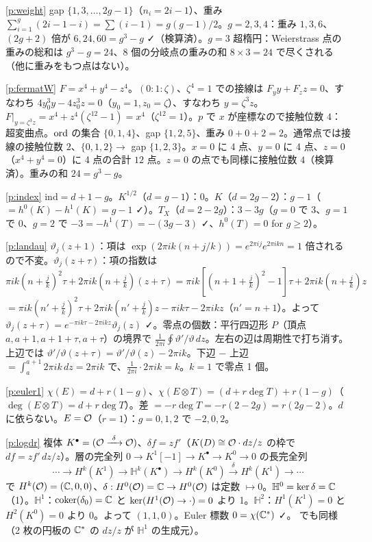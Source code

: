 \begin{sol}{\ref{p:weight}}
gap $\{1,3,\dots,2g-1\}$（$n_i=2i-1$）、重み $\sum_{i=1}^g(2i-1-i)=\sum(i-1)=g(g-1)/2$。$g=2,3,4$：重み $1,3,6$、$(2g+2)$ 倍が $6,24,60=g^3-g$ ✓（検算済）。$g=3$ 超楕円：Weierstrass 点の重みの総和は $g^3-g=24$、$8$ 個の分岐点の重みの和 $8\times3=24$ で尽くされる（他に重みをもつ点はない）。
\end{sol}
\begin{sol}{\ref{p:fermatW}}
$F=x^4+y^4-z^4$。$(0:1:\zeta)$、$\zeta^4=1$ での接線は $F_yy+F_zz=0$、すなわち $4y_0^3y-4z_0^3z=0$（$y_0=1,z_0=\zeta$）、すなわち $y=\zeta^3z$。$F|_{y=\zeta^3z}=x^4+z^4(\zeta^{12}-1)=x^4$（$\zeta^{12}=1$）。$p$ で $x$ が座標なので接触位数 $4$：超変曲点。$\operatorname{ord}$ の集合 $\{0,1,4\}$、gap $\{1,2,5\}$、重み $0+0+2=2$。通常点では接線の接触位数 $2$、$\{0,1,2\}\to$ gap $\{1,2,3\}$。$x=0$ に 4 点、$y=0$ に 4 点、$z=0$（$x^4+y^4=0$）に 4 点の合計 $12$ 点。$z=0$ の点でも同様に接触位数 $4$（検算済）。重みの和 $24=g^3-g$。
\end{sol}
\begin{sol}{\ref{p:index}}
$\mathrm{ind}=d+1-g$。$K^{1/2}$（$d=g-1$）：$0$。$K$（$d=2g-2$）：$g-1$（$=h^0(K)-h^1(K)=g-1$ ✓）。$T_X$（$d=2-2g$）：$3-3g$（$g=0$ で $3$、$g=1$ で $0$、$g=2$ で $-3=-h^1(T)=-(3g-3)$ ✓、$h^0(T)=0$ for $g\ge2$）。
\end{sol}
\begin{sol}{\ref{p:landau}}
$\vartheta_j(z+1)$：項は $\exp(2\pi ik(n+j/k))=e^{2\pi ij}e^{2\pi ikn}=1$ 倍されるので不変。$\vartheta_j(z+\tau)$：項の指数は $\pi ik(n+\tfrac jk)^2\tau+2\pi ik(n+\tfrac jk)(z+\tau)=\pi ik[(n+1+\tfrac jk)^2-1]\tau+2\pi ik(n+\tfrac jk)z$ $=\pi ik(n'+\tfrac jk)^2\tau+2\pi ik(n'+\tfrac jk)z-\pi ik\tau-2\pi ikz$（$n'=n+1$）。よって $\vartheta_j(z+\tau)=e^{-\pi ik\tau-2\pi ikz}\vartheta_j(z)$ ✓。零点の個数：平行四辺形 $P$（頂点 $a,a+1,a+1+\tau,a+\tau$）の境界で $\frac1{2\pi i}\oint\vartheta'/\vartheta\,dz$。左右の辺は周期性で打ち消す。上辺では $\vartheta'/\vartheta(z+\tau)=\vartheta'/\vartheta(z)-2\pi ik$。下辺 $-$ 上辺 $=\int_a^{a+1}2\pi ik\,dz=2\pi ik$ で、$\frac1{2\pi i}\cdot2\pi ik=k$。$k=1$ で零点 1 個。
\end{sol}
\begin{sol}{\ref{p:euler1}}
$\chi(E)=d+r(1-g)$、$\chi(E\otimes T)=(d+r\deg T)+r(1-g)$（$\deg(E\otimes T)=d+r\deg T$）。差 $=-r\deg T=-r(2-2g)=r(2g-2)$。$d$ に依らない。$E=\mathcal O$（$r=1$）：$g=0,1,2$ で $-2,0,2$。
\end{sol}
\begin{sol}{\ref{p:logdr}}
複体 $K^\bullet=(\Oc\xrightarrow{\ \delta\ }\Oc)$、$\delta f=zf'$（$K(D)\cong\mathcal O\cdot dz/z$ の枠で $df=zf'\,dz/z$）。層の完全列 $0\to K^1[-1]\to K^\bullet\to K^0\to0$ の長完全列
\[
\cdots\to H^k(K^1)\to\mathbb H^k(K^\bullet)\to H^k(K^0)\xrightarrow{\delta}H^k(K^1)\to\cdots
\]
で $H^k(\mathcal O)=(\mathbb C,0,0)$、$\delta:H^0(\mathcal O)=\mathbb C\to H^0(\mathcal O)$ は定数 $\mapsto0$。$\mathbb H^0=\ker\delta=\mathbb C$（1）。$\mathbb H^1$：$\mathrm{coker}(\delta_0)=\mathbb C$ と $\ker(H^1(\mathcal O)\to\cdot)=0$ より 1。$\mathbb H^2$：$H^1(K^1)=0$ と $H^2(K^0)=0$ より $0$。よって $(1,1,0)$。Euler 標数 $0=\chi(\mathbb C^*)$ ✓。\Cech{} でも同様（2 枚の円板の $\mathbb C^*$ の $dz/z$ が $\mathbb H^1$ の生成元）。
\end{sol}


